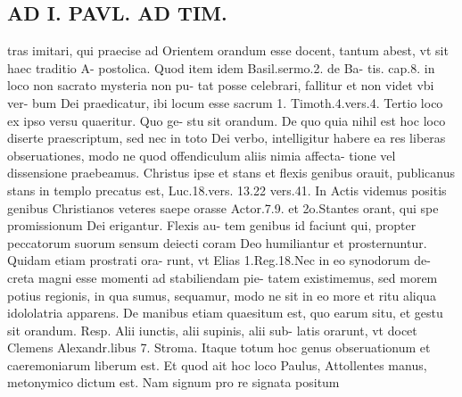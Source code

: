 \documentclass{article}
\begin{document}
\begin{pages}
\section*{AD I. PAVL. AD TIM. }
\marginpar{[ p.74 ]}\pstart tras imitari, qui praecise ad Orientem orandum esse docent, tantum abest, vt sit haec traditio A- postolica. Quod item idem Basil.sermo.2. de Ba- tis. cap.8. in loco non sacrato mysteria non pu- tat posse celebrari, fallitur et non videt vbi ver- bum Dei praedicatur, ibi locum esse sacrum 1. Timoth.4.vers.4.  \pend\pstart Tertio loco ex ipso versu quaeritur. Quo ge- stu sit orandum. De quo quia nihil est hoc loco diserte praescriptum, sed nec in toto Dei verbo, intelligitur habere ea res liberas obseruationes, modo ne quod offendiculum aliis nimia affecta- tione vel dissensione praebeamus. Christus ipse et stans et flexis genibus orauit, publicanus stans in templo precatus est, Luc.18.vers. 13.22 vers.41. In Actis videmus positis genibus Christianos veteres saepe orasse Actor.7.9. et 2o.Stantes orant, qui spe promissionum Dei erigantur. Flexis au- tem genibus id faciunt qui, propter peccatorum suorum sensum deiecti coram Deo humiliantur et prosternuntur. Quidam etiam prostrati ora- runt, vt Elias 1.Reg.18.Nec in eo synodorum de- creta magni esse momenti ad stabiliendam pie- tatem existimemus, sed morem potius regionis, in qua sumus, sequamur, modo ne sit in eo more et ritu aliqua idololatria apparens. De manibus etiam quaesitum est, quo earum situ, et gestu sit orandum. Resp. Alii iunctis, alii supinis, alii sub- latis orarunt, vt docet Clemens Alexandr.libus 7. Stroma. Itaque totum hoc genus obseruationum et caeremoniarum liberum est. Et quod ait hoc loco Paulus, Attollentes manus, metonymico dictum est. Nam signum pro re signata positum  \pend

\end{pages}
\end{document}
